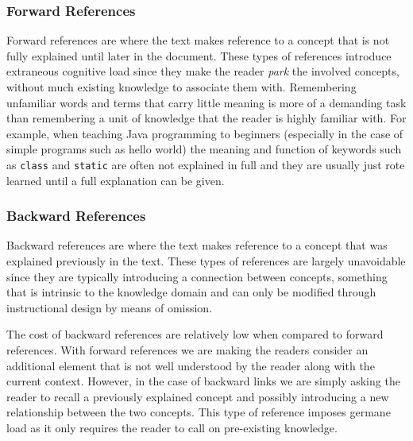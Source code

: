 \documentclass[12pt]{article}
\begin{document}
\subsubsection{Forward References}
Forward references are where the text makes reference to a concept that is not fully explained until later in the document. These types of references introduce extraneous cognitive load since they make the reader \textit{park} the involved concepts, without much existing knowledge to associate them with. Remembering unfamiliar words and terms that carry little meaning is more of a demanding task than remembering a unit of knowledge that the reader is highly familiar with. For example, when teaching Java programming to beginners (especially in the case of simple programs such as hello world) the meaning and function of keywords such as \texttt{class} and \texttt{static} are often not explained in full and they are usually just rote learned until a full explanation can be given.

\subsubsection{Backward References}
Backward references are where the text makes reference to a concept that was explained previously in the text. These types of references are largely unavoidable since they are typically introducing a connection between concepts, something that is intrinsic to the knowledge domain and can only be modified through instructional design by means of omission. 

The cost of backward references are relatively low when compared to forward references. With forward references we are making the readers consider an additional element that is not well understood by the reader along with the current context. However, in the case of backward links we are simply asking the reader to recall a previously explained concept and possibly introducing a new relationship between the two concepts. This type of reference imposes germane load as it only requires the reader to call on pre-existing knowledge. 
\end{document}

